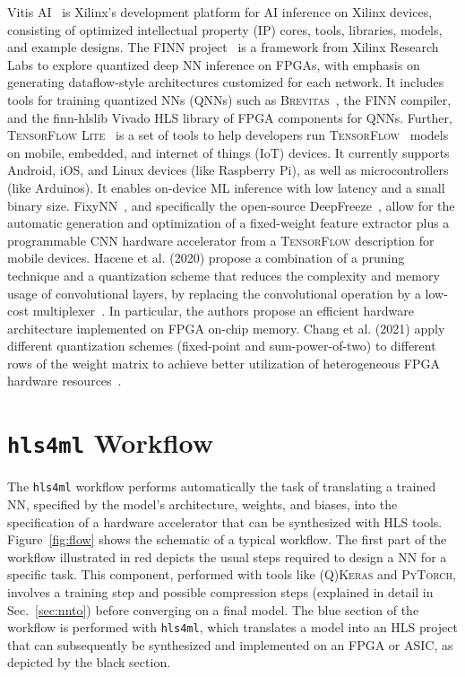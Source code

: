\documentclass[tinyml]{acmart}
\newcommand{\hlsfml}{\texttt{hls4ml}\xspace}
\begin{document}
Vitis AI~\cite{vitisai} is Xilinx's development platform for AI inference on Xilinx devices, consisting of optimized intellectual property (IP) cores, tools, libraries, models, and example designs.
The FINN project~\cite{blott2018finnr,FINN,finn_github} is a framework from Xilinx Research Labs to explore quantized deep NN inference on FPGAs, with emphasis on generating dataflow-style architectures customized for each network.
It includes tools for training quantized NNs (QNNs) such as \textsc{Brevitas}~\cite{brevitas}, the FINN compiler, and the finn-hlslib Vivado HLS library of FPGA components for QNNs.
Further, \textsc{TensorFlow Lite}~\cite{tflite} is a set of tools to help developers run \textsc{TensorFlow}~\cite{tensorflow2015-whitepaper} models on mobile, embedded, and internet of things (IoT) devices.
It currently supports Android, iOS, and Linux devices (like Raspberry Pi), as well as microcontrollers (like Arduinos).
It enables on-device ML inference with low latency and a small binary size.
FixyNN~\cite{whatmough2019fixynn}, and specifically the open-source DeepFreeze~\cite{deepfreeze}, allow for the automatic generation and optimization of a fixed-weight feature extractor plus a programmable CNN hardware accelerator from a \textsc{TensorFlow} description for mobile devices.
Hacene et al. (2020) propose a combination of a pruning technique and a quantization scheme that reduces the complexity and memory usage of convolutional layers, by replacing the convolutional operation by a low-cost multiplexer~\cite{hacene2018quantized}.
In particular, the authors propose an efficient hardware architecture implemented on FPGA on-chip memory.
Chang et al. (2021) apply different quantization schemes (fixed-point and sum-power-of-two) to different rows of the weight matrix to achieve better utilization of heterogeneous FPGA hardware resources~\cite{chang2020mix}.


\section{\hlsfml Workflow}
\label{sec:flow}

The \hlsfml workflow performs automatically the task of translating a trained NN, specified by the model’s architecture, weights, and biases, into the specification of a hardware accelerator that can be synthesized with HLS tools.
Figure~\ref{fig:flow} shows the schematic of a typical workflow.
The first part of the workflow illustrated in red depicts the usual steps required to design a NN for a specific task.
This component, performed with tools like \textsc{(Q)Keras} and \textsc{PyTorch}, involves a training step and possible compression steps (explained in detail in Sec.~\ref{sec:nnto}) before converging on a final model.
The blue section of the workflow is performed with \hlsfml, which translates a model into an HLS project that can subsequently be synthesized and implemented on an FPGA or ASIC, as depicted by the black section.
\end{document}
